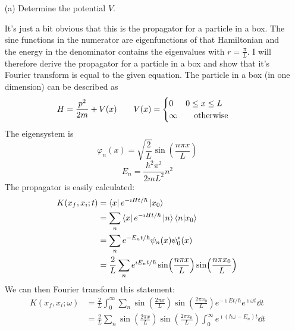 \documentclass[a4paper,twoside]{article}
\begin{document}
\begin{itemize}
    \item[(a)] Determine the potential $ V $.
        \begin{problem}
            It's just a bit obvious that this is the propagator for a particle in a box. The sine functions in the numerator are eigenfunctions of that Hamiltonian and the energy in the denominator contains the eigenvalues with $ r = \frac{\pi}{L} $. I will therefore derive the propagator for a particle in a box and show that it's Fourier transform is equal to the given equation. The particle in a box (in one dimension) can be described as
            \begin{equation}
                H = \frac{p^2}{2m} + V(x) \qquad V(x) = \begin{cases} 0 & 0 \leq x \leq L \\ \infty &\qotherwise \end{cases}
            \end{equation}
            The eigensystem is
            \begin{equation}
                \varphi_n(x) = \sqrt{\frac{2}{L}} \sin(\frac{n \pi x}{L})
            \end{equation}
            \begin{equation}
                E_n = \frac{\hbar^2 \pi^2}{2mL^2} n^2
            \end{equation}
            The propagator is easily calculated:
            \begin{align}
                K(x_f, x_i ; t) &= \bra{x} e^{-\imath Ht / \hbar}\ket{x_0} \\
                &= \sum_n\bra{x} e^{-\imath H t / \hbar}\ket{n}\bra{n}\ket{x_0} \\
                &= \sum_n e^{- E_n t / \hbar} \psi_n(x) \psi_0^*(x) \\
                &= \frac{2}{L} \sum_n e^{\imath E_n t / \hbar} \sin(\frac{n \pi x}{L}) \sin(\frac{n \pi x_0}{L})
            \end{align}
            We can then Fourier transform this statement:
            \begin{align}
                K(x_f, x_i ; \omega) &= \frac{2}{L} \int_0^{\infty} \sum_n \sin(\frac{2 \pi x}{L}) \sin(\frac{2 \pi x_0}{L}) e^{- \imath E t / \hbar} e^{\imath \omega t} \dd{t} \\
                &= \frac{2}{L} \sum_n \sin(\frac{2 \pi x}{L}) \sin(\frac{2 \pi x_0}{L}) \int_0^{\infty} e^{\imath (\hbar \omega - E_n)t} \dd{t} \\

\end{align}
\end{problem}
\end{itemize}
\end{document}
